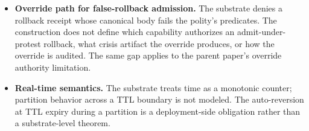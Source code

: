 \begin{itemize}
    key whose custody, rotation, revocation, and compromise recovery
    is outside the present construction. The parent paper's
    inheritance applies: per-kernel Ed25519 signing assumes a key-
    management story (HSM, KMS, TEE-bound key handles) the present
    construction does not specify.
  \item \textbf{Override path for false-rollback admission.} The
    substrate denies a rollback receipt whose canonical body fails
    the polity's predicates. The construction does not define which
    capability authorizes an admit-under-protest rollback, what
    crisis artifact the override produces, or how the override is
    audited. The same gap applies to the parent paper's override
    authority limitation.
  \item \textbf{Real-time semantics.} The substrate treats time as a
    monotonic counter; partition behavior across a TTL boundary is
    not modeled. The auto-reversion at TTL expiry during a partition
    is a deployment-side obligation rather than a substrate-level
    theorem.
\end{itemize}
